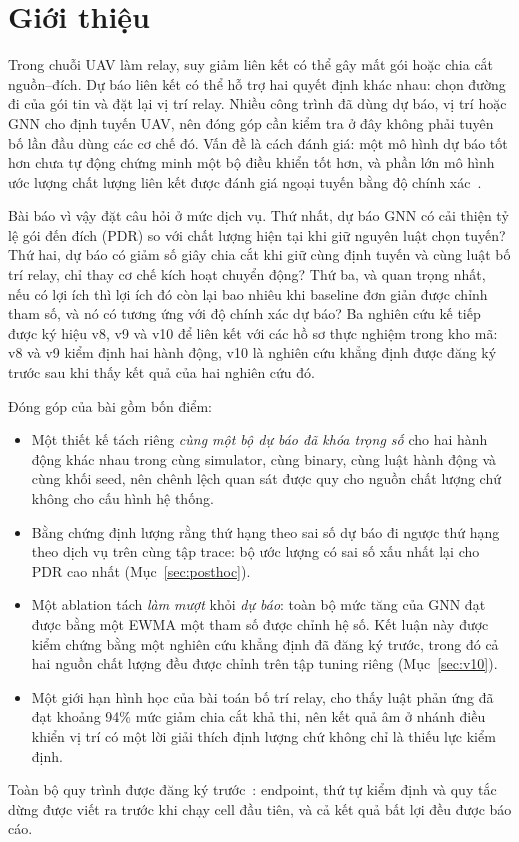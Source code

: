 \documentclass[11pt,a4paper]{article}
\begin{document}
\section{Giới thiệu}
Trong chuỗi UAV làm relay, suy giảm liên kết có thể gây mất gói hoặc chia cắt
nguồn--đích. Dự báo liên kết có thể hỗ trợ hai quyết định khác nhau: chọn đường
đi của gói tin và đặt lại vị trí relay. Nhiều công trình đã dùng dự báo, vị trí
hoặc GNN cho định tuyến UAV, nên đóng góp cần kiểm tra ở đây không phải tuyên
bố lần đầu dùng các cơ chế đó. Vấn đề là cách đánh giá: một mô hình dự báo tốt
hơn chưa tự động chứng minh một bộ điều khiển tốt hơn, và phần lớn mô hình ước
lượng chất lượng liên kết được đánh giá ngoại tuyến bằng độ chính xác~\cite{cerar}.

Bài báo vì vậy đặt câu hỏi ở mức dịch vụ. Thứ nhất, dự báo GNN có cải thiện tỷ
lệ gói đến đích (PDR) so với chất lượng hiện tại khi giữ nguyên luật chọn
tuyến? Thứ hai, dự báo có giảm số giây chia cắt khi giữ cùng định tuyến và cùng
luật bố trí relay, chỉ thay cơ chế kích hoạt chuyển động? Thứ ba, và quan trọng
nhất, nếu có lợi ích thì lợi ích đó còn lại bao nhiêu khi baseline đơn giản
được chỉnh tham số, và nó có tương ứng với độ chính xác dự báo? Ba nghiên cứu
kế tiếp được ký hiệu v8, v9 và v10 để liên kết với các hồ sơ thực nghiệm trong
kho mã: v8 và v9 kiểm định hai hành động, v10 là nghiên cứu khẳng định được
đăng ký trước sau khi thấy kết quả của hai nghiên cứu đó.

Đóng góp của bài gồm bốn điểm:
\begin{itemize}
\item Một thiết kế tách riêng \emph{cùng một bộ dự báo đã khóa trọng số} cho
hai hành động khác nhau trong cùng simulator, cùng binary, cùng luật hành động
và cùng khối seed, nên chênh lệch quan sát được quy cho nguồn chất lượng chứ
không cho cấu hình hệ thống.
\item Bằng chứng định lượng rằng thứ hạng theo sai số dự báo đi ngược thứ hạng
theo dịch vụ trên cùng tập trace: bộ ước lượng có sai số xấu nhất lại cho PDR
cao nhất (Mục~\ref{sec:posthoc}).
\item Một ablation tách \emph{làm mượt} khỏi \emph{dự báo}: toàn bộ mức tăng của
GNN đạt được bằng một EWMA một tham số được chỉnh hệ số. Kết luận này được kiểm
chứng bằng một nghiên cứu khẳng định đã đăng ký trước, trong đó cả hai nguồn
chất lượng đều được chỉnh trên tập tuning riêng (Mục~\ref{sec:v10}).
\item Một giới hạn hình học của bài toán bố trí relay, cho thấy luật phản ứng
đã đạt khoảng 94\% mức giảm chia cắt khả thi, nên kết quả âm ở nhánh điều khiển
vị trí có một lời giải thích định lượng chứ không chỉ là thiếu lực kiểm định.
\end{itemize}
Toàn bộ quy trình được đăng ký trước~\cite{nosek}: endpoint, thứ tự kiểm định
và quy tắc dừng được viết ra trước khi chạy cell đầu tiên, và cả kết quả bất
lợi đều được báo cáo.
\end{document}
